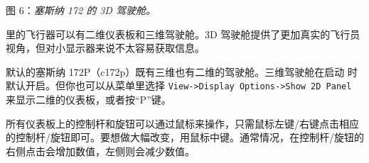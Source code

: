  \centerline{}

\smallskip
 \noindent
\ifchinese
图 6：\textit{塞斯纳 172 的 3D 驾驶舱。}
\fi

{}

\medskip
\ifchinese
\FlightGear{} 里的飞行器可以有二维仪表板和三维驾驶舱。3D 驾驶舱提供了更加真实的飞行员视角，但对小显示器来说不太容易获取信息。

默认的塞斯纳 172P（c172p）既有三维也有二维的驾驶舱。三维驾驶舱在启动 \FlightGear{} 时默认开启。但你也可以从菜单里选择 \texttt{View->Display Options->Show 2D Panel} 来显示二维的仪表板，或者按“P”键。

所有仪表板上的控制杆和旋钮可以通过鼠标来操作，只需鼠标左键/右键点击相应的控制杆/旋钮即可。要想做大幅改变，用鼠标中键。通常情况，在控制杆/旋钮的右侧点击会增加数值，左侧则会减少数值。

